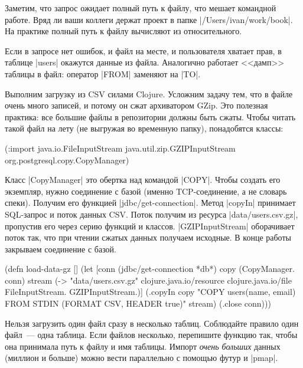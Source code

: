 Заметим, что запрос ожидает полный путь к файлу, что мешает командной
работе. Вряд ли ваши коллеги держат проект в папке
\spverb|/Users/ivan/work/book|. На практике полный путь к файлу вычисляют из
относительного.

Если в запросе нет ошибок, и файл на месте, и пользователя хватает прав, в
таблице \spverb|users| окажутся данные из файла. Аналогично работает <<дамп>>
таблицы в файл: оператор \spverb|FROM| заменяют на \spverb|TO|.

Выполним загрузку из CSV силами Clojure. Усложним задачу тем, что в файле очень
много записей, и потому он сжат архиватором GZip. Это полезная практика: все
большие файлы в репозитории должны быть сжаты. Чтобы читать такой файл на лету
(не выгружая во временную папку), понадобятся классы:

\begin{english}
  \begin{clojure}
(:import java.io.FileInputStream
         java.util.zip.GZIPInputStream
         org.postgresql.copy.CopyManager)
  \end{clojure}
\end{english}

Класс \spverb|CopyManager| это обертка над командой \spverb|COPY|. Чтобы создать
его экземпляр, нужно соединение с базой (именно TCP-соединение, а не словарь
спеки). Получим его функцией \spverb|jdbc/get-connection|. Метод \spverb|copyIn|
принимает SQL-запрос и поток данных CSV. Поток получим из ресурса
\spverb|data/users.csv.gz|, пропустив его через серию функций и
классов. \spverb|GZIPInputStream| оборачивает поток так, что при чтении сжатых
данных получаем исходные. В конце работы закрываем соединение с базой.

\begin{english}
  \begin{clojure}
(defn load-data-gz []
  (let [conn (jdbc/get-connection *db*)
        copy (CopyManager. conn)
        stream (-> "data/users.csv.gz"
                   clojure.java.io/resource
                   clojure.java.io/file
                   FileInputStream.
                   GZIPInputStream.)]
    (.copyIn copy "COPY users(name, email)
                   FROM STDIN (FORMAT CSV, HEADER true)"
             stream)
    (.close conn)))
  \end{clojure}
\end{english}

Нельзя загрузить один файл сразу в несколько таблиц. Соблюдайте правило один
файл~--- одна таблица. Если файлов несколько, перепишите функцию так, чтобы она
принимала путь к файлу и имя таблицы. Импорт \emph{очень больших} данных
(миллион и больше) можно вести параллельно с помощью футур и \spverb|pmap|.

